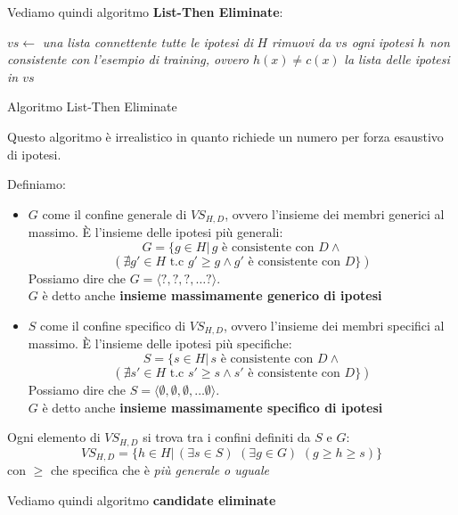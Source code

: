 Vediamo quindi algoritmo \textbf{List-Then Eliminate}:
\begin{algorithm}[H]
  \begin{algorithmic}
    \State $vs \gets$ \textit{una lista connettente tutte le ipotesi di } $H$
    \State \textit{rimuovi da $vs$ ogni ipotesi $h$ non consistente con}
    \State \textit{l'esempio di training, ovvero $h(x)\neq c(x)$}
    \EndFor
    \Return \textit{la lista delle ipotesi in $vs$}
    \EndFunction
  \end{algorithmic}
  \caption{Algoritmo List-Then Eliminate}
\end{algorithm}
Questo algoritmo è irrealistico in quanto richiede un numero per forza esaustivo
di ipotesi.
\begin{definizione}
  Definiamo:
  \begin{itemize}
    \item $G$ come il confine generale di $VS_{H,D}$, ovvero l'insieme dei
    membri generici al massimo. È l'insieme delle ipotesi più generali:
    \[G=\{g\in H|\, g\mbox{ è consistente con }D \land\]
    \[ (\nexists g'\in H \mbox{ t.c } g'\geq g \land g'\mbox{ è consistente con
      }D\})\]
    Possiamo dire che $G=\langle ?,?,?,\ldots ?\rangle$.\\
    $G$ è detto anche \textbf{insieme massimamente generico di ipotesi}
    \item $S$ come il confine specifico di $VS_{H,D}$, ovvero l'insieme dei
    membri specifici al massimo. È l'insieme delle ipotesi più specifiche:
     \[S=\{s\in H|\, s\mbox{ è consistente con }D \land\]
    \[ (\nexists s'\in H \mbox{ t.c } s'\geq s \land s'\mbox{ è consistente con
      }D\})\]
    Possiamo dire che $S=\langle \emptyset,\emptyset,\emptyset,\ldots \emptyset
    \rangle$.\\
        $G$ è detto anche \textbf{insieme massimamente specifico di ipotesi}

      \end{itemize}
    \end{definizione}
    \begin{teorema}
      Ogni elemento di $VS_{H,D}$ si trova tra i confini definiti da $S$ e $G$:
      \[VS_{H,D}=\{h\in H|\,(\exists s\in S)\,\,(\exists g\in G)\,\,(g\geq h\geq
        s)\}\]
      con $\geq$ che specifica che è \textit{più generale o uguale}
    \end{teorema}
    Vediamo quindi algoritmo \textbf{candidate eliminate}
